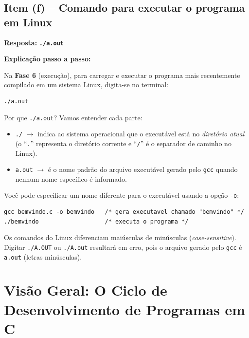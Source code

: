 \documentclass[12pt,a4paper]{article}
\begin{document}
\bigskip

\subsection*{Item (f) -- Comando para executar o programa em Linux}

\begin{respostabox}
\textbf{Resposta:} \textcolor{deitelblue}{\textbf{\texttt{./a.out}}}

\medskip
\textbf{Explicação passo a passo:}

Na \textbf{Fase 6} (execução), para carregar e executar o programa mais recentemente
compilado em um sistema Linux, digita-se no terminal:

\begin{lstlisting}
./a.out
\end{lstlisting}

Por que \texttt{./a.out}? Vamos entender cada parte:

\begin{itemize}
  \item \texttt{./} $\rightarrow$ indica ao sistema operacional que o executável está no
  \textit{diretório atual} (o ``\texttt{.}'' representa o diretório corrente e ``\texttt{/}''
  é o separador de caminho no Linux).
  \item \texttt{a.out} $\rightarrow$ é o nome padrão do arquivo executável gerado pelo
  \texttt{gcc} quando nenhum nome específico é informado.
\end{itemize}

Você pode especificar um nome diferente para o executável usando a opção \texttt{-o}:
\begin{lstlisting}
gcc bemvindo.c -o bemvindo   /* gera executavel chamado "bemvindo" */
./bemvindo                   /* executa o programa */
\end{lstlisting}

\begin{erroco}
  Os comandos do Linux diferenciam maiúsculas de minúsculas
  (\textit{case-sensitive}). Digitar \texttt{./A.OUT} ou \texttt{./A.out}
  resultará em erro, pois o arquivo gerado pelo \texttt{gcc} é \texttt{a.out}
  (letras minúsculas).
\end{erroco}
\end{respostabox}

\newpage

\section*{Visão Geral: O Ciclo de Desenvolvimento de Programas em C}
\end{document}

